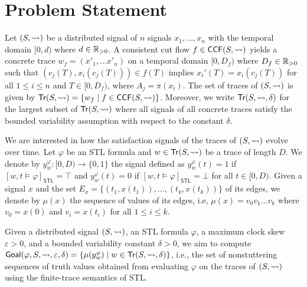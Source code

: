 \section{Problem Statement}
Let $(S,{\rightsquigarrow})$ be a distributed signal of $n$ signals $x_1, \ldots, x_n$ with the temporal domain $[0,d)$ where $d \in \mathbb{R}_{> 0}$.
A consistent cut flow $f \in \mathsf{CCF}(S,{\rightsquigarrow})$ yields a concrete trace $w_f = 
(x'_1, \ldots x'_n)$ on 
a temporal domain $[0,D_f)$ where $D_f \in \mathbb{R}_{> 0}$ such that $(c_j(T), 
x_i(c_j(T))) \in f(T)$ implies $x_i'(T) = x_i(c_j(T))$ for all $1 \leq i \leq n$ 
and $T \in [0, D_f)$, where $A_j = \pi(x_i)$.
The set of traces of $(S,{\rightsquigarrow})$ is given by $\tr(S,{\hb}) = \{ w_f \st f \in \CCF(S,{\hb})\}$.
Moreover, we write $\mathsf{Tr}(S,{\rightsquigarrow},\delta)$ for the largest subset of $\mathsf{Tr}(S,{\rightsquigarrow})$ where all signals of all concrete traces satisfy the bounded variability assumption with respect to the constant $\delta$.

We are interested in how the satisfaction signals of the traces of $(S,{\rightsquigarrow})$ evolve over time.
Let $\varphi$ be an STL formula and $w \in \mathsf{Tr}(S,{\rightsquigarrow})$ be a trace of length $D$.
We denote by $y_w^\varphi : [0,D) \to \{0,1\}$ the signal defined as $y_w^\varphi(t) = 1$ if $[w, t \models \varphi]_{\mathsf{STL}} = \top$ and $y_w^\varphi(t) = 0$ if $[w, t \models \varphi]_{\mathsf{STL}} = \bot$ for all $t \in [0,D)$.
Given a signal $x$ and the set $E_x = \{(t_1, x(t_1)), \ldots, (t_k, x(t_k))\}$ of its edges, we denote by $\mu(x)$ the sequence of values of its edges, i.e, $\mu(x) = v_0 v_1 \ldots v_k$ where $v_0 = x(0)$ and $v_i = x(t_i)$ for all $1 \leq i \leq k$.

Given a distributed signal $(S, {\rightsquigarrow})$, an STL formula $\varphi$, a maximum clock skew $\varepsilon > 0$, and a bounded variability constant $\delta > 0$, we aim to compute $\mathsf{Goal}(\varphi, S, {\hb}, \varepsilon, \delta) = \{ \mu(y_w^\varphi) \st w \in \tr(S, {\hb}, \delta) \}$, i.e., the set of nonstuttering sequences of truth values obtained from evaluating $\varphi$ on the traces of $(S, {\rightsquigarrow})$ using the finite-trace semantics of STL.